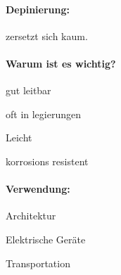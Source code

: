 \documentclass{article}
\begin{document}
\begin{multicols}{3}
\paragraph{Depinierung:}
\begin{compactitem}
  \item zersetzt sich kaum.
\end{compactitem}

\paragraph{Warum ist es wichtig?}
\begin{compactitem}
  \item gut leitbar
  \item oft in legierungen
  \item Leicht
  \item korrosions resistent
\end{compactitem}

\paragraph{Verwendung:}
\begin{compactitem}
  \item Architektur
  \item Elektrische Geräte
  \item Transportation
\end{compactitem}



\end{multicols}


\newpage
\pagestyle{fancy}
\fancyhf{}                    %
\end{document}
